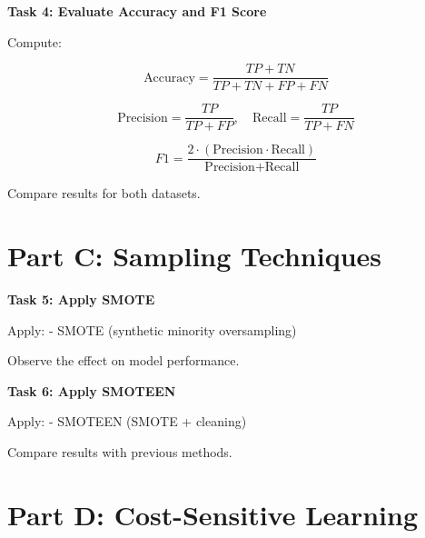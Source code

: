 \documentclass[12pt,a4paper]{article}
\begin{document}
\begin{tcolorbox}
\textbf{Task 4: Evaluate Accuracy and F1 Score}

Compute:

\[
\text{Accuracy} = \frac{TP + TN}{TP + TN + FP + FN}
\]

\[
\text{Precision} = \frac{TP}{TP + FP}, \quad
\text{Recall} = \frac{TP}{TP + FN}
\]

\[
F1 = \frac{2 \cdot (\text{Precision} \cdot \text{Recall})}{\text{Precision} + \text{Recall}}
\]

Compare results for both datasets.

\vspace{2cm}

\vspace{2cm}
\end{tcolorbox}


\section*{Part C: Sampling Techniques}

\begin{tcolorbox}
\textbf{Task 5: Apply SMOTE}

Apply:
- SMOTE (synthetic minority oversampling)

Observe the effect on model performance.

\vspace{2cm}

\vspace{2cm}
\end{tcolorbox}

\vspace{6pt}

\begin{tcolorbox}
\textbf{Task 6: Apply SMOTEEN}

Apply:
- SMOTEEN (SMOTE + cleaning)

Compare results with previous methods.

\vspace{2cm}

\vspace{2cm}
\end{tcolorbox}


\section*{Part D: Cost-Sensitive Learning}
\end{document}
